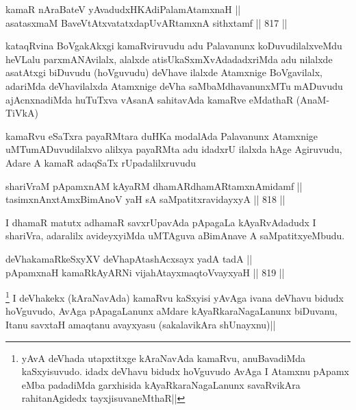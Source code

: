 
\begin{shl}
kamaR nA\s \s raBateV yAvadudxHKAdiPalamAtamxnaH || \\
asatasxmaM BaveVtAtxvatatxdapUvARtamxnA sithxtamf ||  817 ||  
\end{shl}

\begin{artha}
kataqRvina BoVgakAkxgi kamaRviruvudu adu Palavanunx koDuvudilalxveMdu heVLalu parxmANAvilalx, alalxde atisUkaSxmXvAdadadxriMda adu nilalxde asatAtxgi biDuvudu (hoVguvudu) deVhave ilalxde Atamxnige BoVgavilalx, adariMda deVhavilalxda Atamxnige deVha saMbaMdhavanunxMTu mADuvudu ajAcnxnadiMda huTuTxva vAsanA sahitavAda kamaRve eMdathaR (AnaM-TiVkA)
\end{artha}

\begin{artha}
kamaRvu eSaTxra payaRMtara duHKa modalAda Palavanunx Atamxnige uMTumADuvudilalxvo alilxya payaRMta adu idadxrU ilalxda hAge Agiruvudu, Adare A kamaR adaqSaTx rUpadalilxruvudu
\end{artha}


\begin{shl}
shariVraM pApamxnAM kAyaRM dhamARdhamARtamxnAmidamf || \\
tasimxnAnxtAmxBimAnoV yaH sA saMpatitxravidayxyA ||  818 ||  
\end{shl}

\begin{artha}
I dhamaR matutx adhamaR savxrUpavAda pApagaLa kAyaRvAdadudx I shariVra, adaralilx avideyxyiMda uMTAguva aBimAnave A saMpatitxyeMbudu.
\end{artha}


\begin{shl}
deVhakamaRkeSxyXV deVhapAtashAcxsayx yadA tadA ||  \\
pApamxnaH kamaRkAyARNi vijahAtayxmaqtoV\s vayxyaH ||  819 ||  
\end{shl}

\begin{artha}
\footnote{yAvA deVhada utapxtitxge kAraNavAda kamaRvu, anuBavadiMda kaSxyisuvudo. idadx deVhavu bidudx hoVguvudo AvAga I Atamxnu pApamx eMba padadiMda garxhisida kAyaRkaraNagaLanunx savaRvikAra rahitanAgidedx tayxjisuvaneMthaR||}
I deVhakekx (kAraNavAda) kamaRvu kaSxyisi yAvAga ivana deVhavu bidudx hoVguvudo, AvAga pApagaLanunx aMdare kAyaRkaraNagaLanunx biDuvanu, Itanu savxtaH amaqtanu avayxyasu (sakalavikAra shUnayxnu)||
\end{artha}


